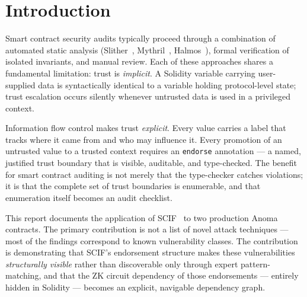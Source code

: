 \documentclass[11pt,a4paper]{article}
\begin{document}
\tableofcontents

\section{Introduction}

Smart contract security audits typically proceed through a combination of
automated static analysis (Slither~\cite{slither}, Mythril~\cite{mythril},
Halmos~\cite{halmos}), formal verification of
isolated invariants, and manual review. Each of these approaches shares a
fundamental limitation: trust is \emph{implicit}. A Solidity variable carrying
user-supplied data is syntactically identical to a variable holding
protocol-level state; trust escalation occurs silently whenever untrusted data
is used in a privileged context.

Information flow control makes trust \emph{explicit}. Every value carries a
label that tracks where it came from and who may influence it. Every promotion
of an untrusted value to a trusted context requires an \texttt{endorse}
annotation --- a named, justified trust boundary that is visible, auditable, and
type-checked. The benefit for smart contract auditing is not merely that the
type-checker catches violations; it is that the complete set of trust boundaries
is enumerable, and that enumeration itself becomes an audit checklist.

This report documents the application of SCIF~\cite{scif2025} to two production
Anoma contracts. The primary contribution is not a list of novel attack
techniques --- most of the findings correspond to known vulnerability classes.
The contribution is demonstrating that SCIF's endorsement structure makes these
vulnerabilities \emph{structurally visible} rather than discoverable only
through expert pattern-matching, and that the ZK circuit dependency of those
endorsements --- entirely hidden in Solidity --- becomes an explicit, navigable
dependency graph.
\end{document}
